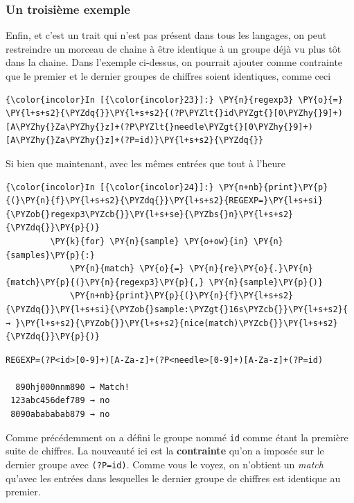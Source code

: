     \hypertarget{un-troisiuxe8me-exemple}{%
\subsubsection{Un troisième exemple}\label{un-troisiuxe8me-exemple}}

    Enfin, et c'est un trait qui n'est pas présent dans tous les langages,
on peut restreindre un morceau de chaine à être identique à un groupe
déjà vu plus tôt dans la chaine. Dans l'exemple ci-dessus, on pourrait
ajouter comme contrainte que le premier et le dernier groupes de
chiffres soient identiques, comme ceci

    \begin{Verbatim}[commandchars=\\\{\}]
{\color{incolor}In [{\color{incolor}23}]:} \PY{n}{regexp3} \PY{o}{=} \PY{l+s+s2}{\PYZdq{}}\PY{l+s+s2}{(?P\PYZlt{}id\PYZgt{}[0\PYZhy{}9]+)[A\PYZhy{}Za\PYZhy{}z]+(?P\PYZlt{}needle\PYZgt{}[0\PYZhy{}9]+)[A\PYZhy{}Za\PYZhy{}z]+(?P=id)}\PY{l+s+s2}{\PYZdq{}}
\end{Verbatim}


    Si bien que maintenant, avec les mêmes entrées que tout à l'heure

    \begin{Verbatim}[commandchars=\\\{\}]
{\color{incolor}In [{\color{incolor}24}]:} \PY{n+nb}{print}\PY{p}{(}\PY{n}{f}\PY{l+s+s2}{\PYZdq{}}\PY{l+s+s2}{REGEXP=}\PY{l+s+si}{\PYZob{}regexp3\PYZcb{}}\PY{l+s+se}{\PYZbs{}n}\PY{l+s+s2}{\PYZdq{}}\PY{p}{)}
         \PY{k}{for} \PY{n}{sample} \PY{o+ow}{in} \PY{n}{samples}\PY{p}{:}
             \PY{n}{match} \PY{o}{=} \PY{n}{re}\PY{o}{.}\PY{n}{match}\PY{p}{(}\PY{n}{regexp3}\PY{p}{,} \PY{n}{sample}\PY{p}{)}
             \PY{n+nb}{print}\PY{p}{(}\PY{n}{f}\PY{l+s+s2}{\PYZdq{}}\PY{l+s+si}{\PYZob{}sample:\PYZgt{}16s\PYZcb{}}\PY{l+s+s2}{ → }\PY{l+s+s2}{\PYZob{}}\PY{l+s+s2}{nice(match)\PYZcb{}}\PY{l+s+s2}{\PYZdq{}}\PY{p}{)}    
\end{Verbatim}


    \begin{Verbatim}[commandchars=\\\{\}]
REGEXP=(?P<id>[0-9]+)[A-Za-z]+(?P<needle>[0-9]+)[A-Za-z]+(?P=id)

  890hj000nnm890 → Match!
 123abc456def789 → no
 8090abababab879 → no

    \end{Verbatim}

    Comme précédemment on a défini le groupe nommé \texttt{id} comme étant
la première suite de chiffres. La nouveauté ici est la
\textbf{contrainte} qu'on a imposée sur le dernier groupe avec
\texttt{(?P=id)}. Comme vous le voyez, on n'obtient un \emph{match}
qu'avec les entrées dans lesquelles le dernier groupe de chiffres est
identique au premier.

